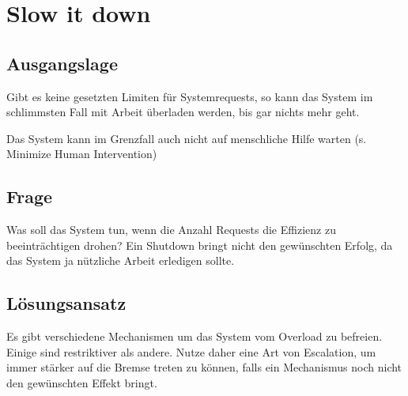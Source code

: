 \section{Slow it down}

\subsection{Ausgangslage}


Gibt es keine gesetzten Limiten für Systemrequests, so kann das System im schlimmsten Fall mit Arbeit überladen werden, bis gar nichts mehr geht.

Das System kann im Grenzfall auch nicht auf menschliche Hilfe warten (s. Minimize Human Intervention)

\subsection{Frage}


Was soll das System tun, wenn die Anzahl Requests die Effizienz zu beeinträchtigen drohen?
Ein Shutdown bringt nicht den gewünschten Erfolg, da das System ja nützliche Arbeit erledigen sollte.

\subsection{Lösungsansatz}


Es gibt verschiedene Mechanismen um das System vom Overload zu befreien. Einige sind restriktiver als andere. Nutze daher eine Art von Escalation, um immer stärker auf die Bremse treten zu können, falls ein Mechanismus noch nicht den gewünschten Effekt bringt.
